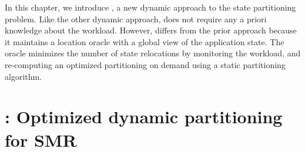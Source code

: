 In this chapter, we introduce \dynastar, a new dynamic approach to the state
partitioning problem. Like the other dynamic approach, \dynastar does not
require any a priori knowledge about the workload. However, \dynastar differs
from the prior approach because it maintains a location oracle with a global
view of the application state. The oracle minimizes the number of state
relocations by monitoring the workload, and re-computing an optimized
partitioning on demand using a static partitioning algorithm.



\section{\dynastar: Optimized dynamic partitioning for SMR}
\label{sec:dynastaridea}

